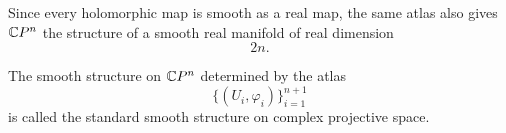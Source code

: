 \begin{remark}
Since every holomorphic map is smooth as a real map, the same atlas also gives
$\mathbb{C}P^n$ the structure of a smooth real manifold of real dimension
\[
  2n.
\]
\end{remark}

\begin{definition}
The smooth structure on $\mathbb{C}P^n$ determined by the atlas
\[
  \{(U_i,\varphi_i)\}_{i=1}^{n+1}
\]
is called the standard smooth structure on complex projective space.
\end{definition}
